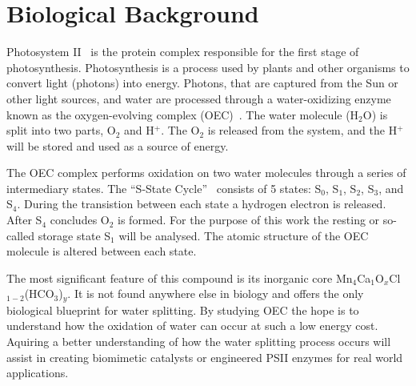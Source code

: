 \section{Biological Background}

Photosystem II~\cite{oxygenicPhotosynthesis} is the protein complex responsible for the first stage of photosynthesis. Photosynthesis is a process used by plants and other organisms to convert light (photons) into energy. Photons, that are captured from the Sun or other light sources, and water are processed through a water-oxidizing enzyme known as the oxygen-evolving complex (OEC)~\cite{yano2006manganese}. The water molecule (H$_{2}$O) is split into two parts, O$_{2}$ and H$^{+}$. The O$_{2}$ is released from the system, and the H$^{+}$ will be stored and used as a source of energy.

The OEC complex performs oxidation on two water molecules through a series of intermediary states. The ``S-State Cycle''~\cite{yano2006manganese} consists of 5 states: S$_{0}$, S$_{1}$, S$_{2}$, S$_{3}$, and S$_{4}$. During the transistion between each state a hydrogen electron is released. After S$_{4}$ concludes O$_{2}$ is formed. For the purpose of this work the resting or so-called storage state S$_{1}$ will be analysed. The atomic structure of the OEC molecule is altered between each state.

The most significant feature of this compound is its inorganic core Mn$_{4}$Ca$_{1}$O$_{x}$Cl$_{1-2}$(HCO$_{3}$)$_{y}$. It is not found anywhere else in biology and offers the only biological blueprint for water splitting. By studying OEC the hope is to understand how the oxidation of water can occur at such a low energy cost. Aquiring a better understanding of how the water splitting process occurs will assist in creating biomimetic catalysts or engineered PSII enzymes for real world applications.
